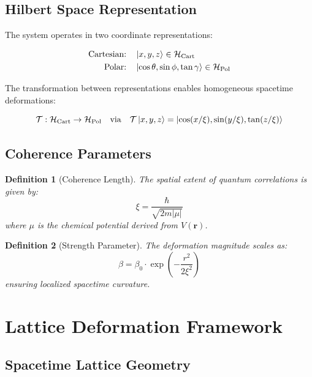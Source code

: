 \documentclass{article}
\newtheorem{definition}{Definition}
\begin{document}
\subsection{Hilbert Space Representation}

The system operates in two coordinate representations:

\begin{align}
\text{Cartesian:} \quad &\ket{x,y,z} \in \mathcal{H}_{\text{Cart}} \\
\text{Polar:} \quad &\ket{\cos\theta, \sin\phi, \tan\gamma} \in \mathcal{H}_{\text{Pol}}
\end{align}

The transformation between representations enables homogeneous spacetime deformations:

\begin{equation}
\mathcal{T}: \mathcal{H}_{\text{Cart}} \rightarrow \mathcal{H}_{\text{Pol}} \quad \text{via} \quad \mathcal{T}\ket{x,y,z} = \ket{\cos(x/\xi), \sin(y/\xi), \tan(z/\xi)}
\end{equation}

\subsection{Coherence Parameters}

\begin{definition}[Coherence Length]
The spatial extent of quantum correlations is given by:
\begin{equation}
\xi = \frac{\hbar}{\sqrt{2m|\mu|}}
\end{equation}
where $\mu$ is the chemical potential derived from $V(\mathbf{r})$.


\end{definition}
\begin{definition}[Strength Parameter]
The deformation magnitude scales as:
\begin{equation}
\beta = \beta_0 \cdot \exp\left(-\frac{r^2}{2\xi^2}\right)
\end{equation}
ensuring localized spacetime curvature.
\end{definition}

\section{Lattice Deformation Framework}

\subsection{Spacetime Lattice Geometry}
\end{document}
